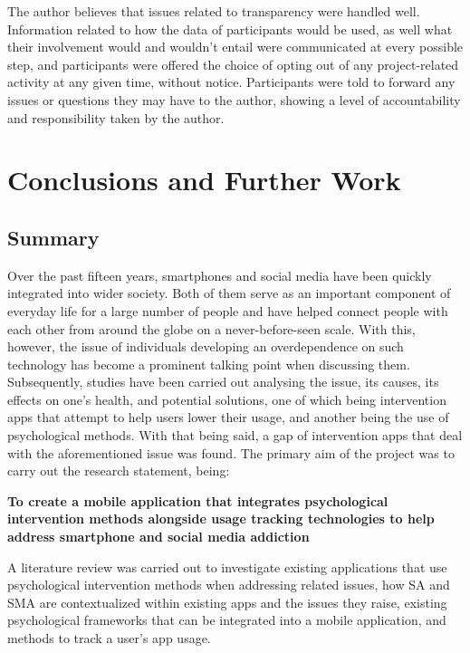 \documentclass[12pt]{article}
\begin{document}
The author believes that issues related to transparency were handled well. Information related to how the data of participants would be used, as
well what their involvement would and wouldn't entail were communicated at every possible step, and participants were offered the choice of 
opting out of any project-related activity at any given time, without notice. Participants were told to forward any issues or questions they
may have to the author, showing a level of accountability and responsibility taken by the author. 


\newpage
\section{Conclusions and Further Work}

\subsection{Summary}
Over the past fifteen years, smartphones and social media have been quickly integrated into wider society. Both of them serve as an important component of everyday life for a large number of 
people and have helped connect people with each other from around the globe on a never-before-seen scale. With this, however, the issue of individuals developing an overdependence on such 
technology has become a prominent talking point when discussing them. Subsequently, studies have been carried out analysing the issue, its causes, its effects on one's health, and potential 
solutions, one of which being intervention apps that attempt to help users lower their usage, and another being the use of psychological methods. With that being said, a gap of intervention apps
that deal with the aforementioned issue was found. The primary aim of the project was to carry out the research statement, being: \newline

\textbf{To create a mobile application that integrates psychological intervention methods alongside usage tracking technologies to help address smartphone and social media addiction} \newline

A literature review was carried out to investigate existing applications that use psychological intervention methods when addressing related issues, how SA and SMA are contextualized within 
existing apps and the issues they raise, existing psychological frameworks that can be integrated into a mobile application, and methods to track a user's app usage. \newline
\end{document}
